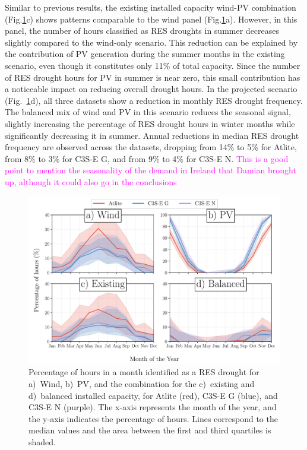 \documentclass[a4paper, 11pt]{article}
\begin{document}
Similar to previous results, the existing installed capacity wind-PV combination (Fig.\ref{fig:res_droughts_seasonality}c) shows patterns comparable to the wind panel (Fig.\ref{fig:res_droughts_seasonality}a). However, in this panel, the number of hours classified as RES droughts in summer decreases slightly compared to the wind-only scenario. This reduction can be explained by the contribution of PV generation during the summer months in the existing scenario, even though it constitutes only 11\% of total capacity. Since the number of RES drought hours for PV in summer is near zero, this small contribution has a noticeable impact on reducing overall drought hours. In the projected scenario (Fig.~\ref{fig:res_droughts_seasonality}d), all three datasets show a reduction in monthly RES drought frequency. The balanced mix of wind and PV in this scenario reduces the seasonal signal, slightly increasing the percentage of RES drought hours in winter months while significantly decreasing it in summer. Annual reductions in median RES drought frequency are observed across the datasets, dropping from 14\% to 5\% for Atlite, from 8\% to 3\% for C3S-E G, and from 9\% to 4\% for C3S-E N. \textcolor{magenta}{This is a good point to mention the seasonality of the demand in Ireland that Damian brought up, although it could also go in the conclusions}
 
\begin{figure}[!ht]
	\centering
	\includegraphics[width=\textwidth]{droughts_seasonality}
	\caption{Percentage of hours in a month identified as a RES drought for a)~Wind, b)~PV, and the combination for the c)~existing and d)~balanced installed capacity, for Atlite (red), C3S-E G (blue), and C3S-E N (purple). The x-axis represents the month of the year, and the y-axis indicates the percentage of hours. Lines correspond to the median values and the area between the first and third quartiles is shaded.}
	\label{fig:res_droughts_seasonality}
\end{figure}
\end{document}
